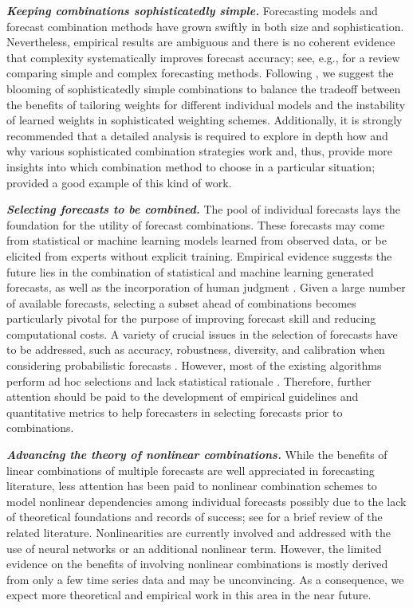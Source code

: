 \documentclass[11pt]{article}
\begin{document}
\textbf{\textit{Keeping combinations sophisticatedly simple.}} Forecasting models and forecast combination methods have grown swiftly in both size and sophistication. Nevertheless, empirical results are ambiguous and there is no coherent evidence that complexity systematically improves forecast accuracy; see, e.g., \citet{Green2015-mi} for a review comparing simple and complex forecasting methods. Following \citet{Zellner2001-si}, we suggest the blooming of sophisticatedly simple combinations to balance the tradeoff between the benefits of tailoring weights for different individual models and the instability of learned weights in sophisticated weighting schemes. Additionally, it is strongly recommended that a detailed analysis is required to explore in depth how and why various sophisticated combination strategies work and, thus, provide more insights into which combination method to choose in a particular situation; \citet{Petropoulos2018-fw} provided a good example of this kind of work.

\textbf{\textit{Selecting forecasts to be combined.}} The pool of individual forecasts lays the foundation for the utility of forecast combinations. These forecasts may come from statistical or machine learning models learned from observed data, or be elicited from experts without explicit training. Empirical evidence suggests the future lies in the combination of statistical and machine learning generated forecasts, as well as the incorporation of human judgment \citep{Petropoulos2018-ad,Makridakis2020-hu,Petropoulos2021-ft}. Given a large number of available forecasts, selecting a subset ahead of combinations becomes particularly pivotal for the purpose of improving forecast skill and reducing computational costs. A variety of crucial issues in the selection of forecasts have to be addressed, such as accuracy, robustness, diversity, and calibration when considering probabilistic forecasts \citep{Lichtendahl2020-ut}. However, most of the existing algorithms perform ad hoc selections and lack statistical rationale \citep{Kourentzes2019-na}. Therefore, further attention should be paid to the development of empirical guidelines and quantitative metrics to help forecasters in selecting forecasts prior to combinations.

\textbf{\textit{Advancing the theory of nonlinear combinations.}} While the benefits of linear combinations of multiple forecasts are well appreciated in forecasting literature, less attention has been paid to nonlinear combination schemes to model nonlinear dependencies among individual forecasts possibly due to the lack of theoretical foundations and records of success; see \citet{Timmermann2006-en} for a brief review of the related literature. Nonlinearities are currently involved and addressed with the use of neural networks or an additional nonlinear term. However, the limited evidence on the benefits of involving nonlinear combinations is mostly derived from only a few time series data and may be unconvincing. As a consequence, we expect more theoretical and empirical work in this area in the near future.
\end{document}

